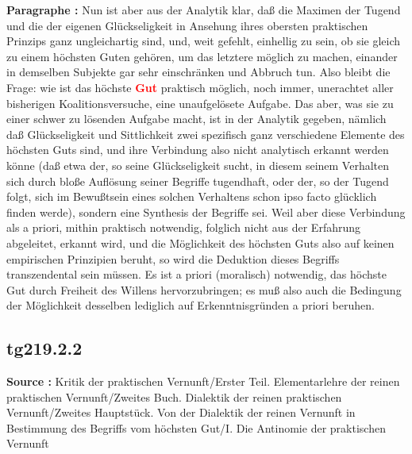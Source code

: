 \documentclass[a4paper,12pt,twoside]{book}
\newcommand{\match}[1]{\textcolor{red}{\textbf{#1}}}
\begin{document}
	\textbf{Paragraphe : }Nun ist aber aus der Analytik klar, daß die Maximen der Tugend und die der eigenen Glückseligkeit in Ansehung ihres obersten praktischen Prinzips ganz ungleichartig sind, und, weit gefehlt, einhellig zu sein, ob sie gleich zu einem höchsten Guten gehören, um das letztere möglich zu machen, einander in demselben Subjekte gar sehr einschränken und Abbruch tun. Also bleibt die Frage: wie ist das höchste \match{Gut} praktisch möglich, noch immer, unerachtet aller bisherigen Koalitionsversuche, eine unaufgelösete Aufgabe. Das aber, was sie zu einer schwer zu lösenden Aufgabe macht, ist in der Analytik gegeben, nämlich daß Glückseligkeit und Sittlichkeit zwei spezifisch ganz verschiedene Elemente des höchsten Guts sind, und ihre Verbindung also nicht analytisch erkannt werden könne (daß etwa der, so seine Glückseligkeit sucht, in diesem seinem Verhalten sich durch bloße Auflösung seiner Begriffe tugendhaft, oder der, so der Tugend folgt, sich im Bewußtsein eines solchen Verhaltens schon ipso facto glücklich finden werde), sondern eine Synthesis der Begriffe sei. Weil aber diese Verbindung als a priori, mithin praktisch notwendig, folglich nicht aus der Erfahrung abgeleitet, erkannt wird, und die Möglichkeit des höchsten Guts also auf keinen empirischen Prinzipien beruht, so wird die Deduktion dieses Begriffs transzendental sein müssen. Es ist a priori (moralisch) notwendig, das höchste Gut durch Freiheit des Willens hervorzubringen; es muß also auch die Bedingung der Möglichkeit desselben lediglich auf Erkenntnisgründen a priori beruhen. 
	
	\subsection*{tg219.2.2} 
	\textbf{Source : }Kritik der praktischen Vernunft/Erster Teil. Elementarlehre der reinen praktischen Vernunft/Zweites Buch. Dialektik der reinen praktischen Vernunft/Zweites Hauptstück. Von der Dialektik der reinen Vernunft in Bestimmung des Begriffs vom höchsten Gut/I. Die Antinomie der praktischen Vernunft\\  
	
\end{document}
